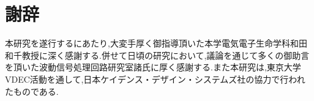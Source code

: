 \chapter*{謝辞}
本研究を遂行するにあたり,大変手厚く御指導頂いた本学電気電子生命学科和田和千教授に深く感謝する.併せて日頃の研究において,議論を通じて多くの御助言を頂いた波動信号処理回路研究室諸氏に厚く感謝する.また本研究は,東京大学VDEC活動を通して,日本ケイデンス・デザイン・システムズ社の協力で行われたものである.

\makesignature
